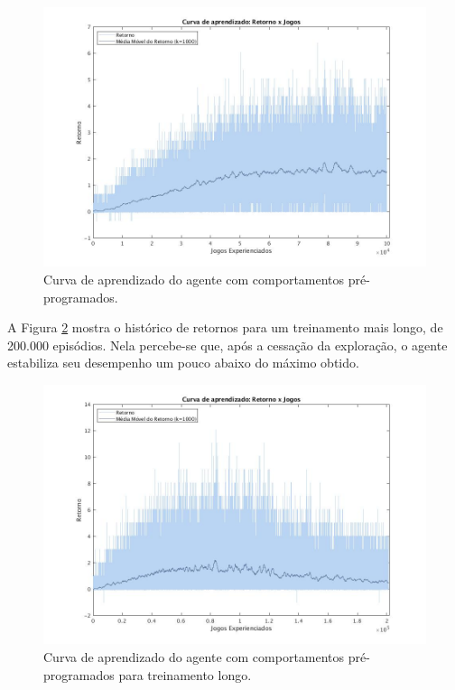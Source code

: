 \begin{figure}[H]
	\includegraphics[width=0.95\linewidth]{figs/curva-behaviors-tabular.jpg}
	\centering
	\caption{Curva de aprendizado do agente com comportamentos pré-programados.}
	\label{fig:single-agent-tabular-behaviors}
\end{figure}

A Figura \ref{fig:curvalonga-bhv} mostra o histórico de retornos para um treinamento mais longo, de 200.000 episódios. Nela percebe-se que, após a cessação da exploração, o agente estabiliza seu desempenho um pouco abaixo do máximo obtido.

\begin{figure}[H]
	\includegraphics[width=1\linewidth]{figs/curvalonga-behaviors-tabular.jpg}
	\centering
	\caption{Curva de aprendizado do agente com comportamentos pré-programados para treinamento longo.}
	\label{fig:curvalonga-bhv}
\end{figure}

